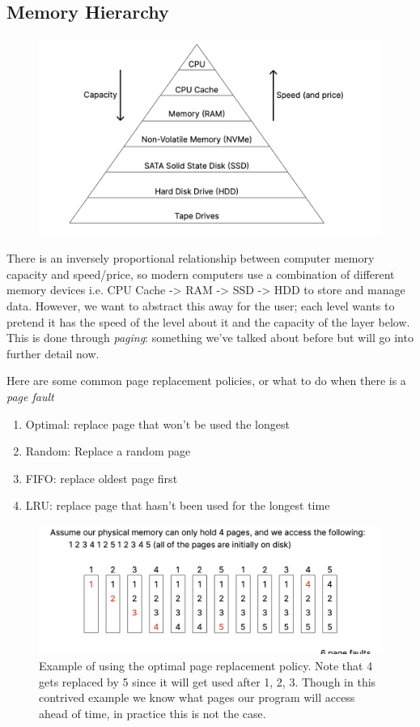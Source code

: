 \documentclass[../notes.tex]{subfiles}
\begin{document}
\subsection{Memory Hierarchy}
\begin{figure}[H]
    \centering
    \includegraphics[width=0.8\linewidth]{img/image_2023-03-29-13-48-02.png}
\end{figure}
There is an inversely proportional relationship between computer memory capacity and speed/price, so modern computers use a combination of different memory devices i.e. CPU Cache -> RAM -> SSD -> HDD to store and manage data.
However, we want to abstract this away for the user; each level wants to pretend it has the speed of the level about it and the capacity of the layer below. 
This is done through \textit{paging}: something we've talked about before but will go into further detail now.

Here are some common page replacement policies, or what to do when there is a \textit{page fault}
\begin{enumerate}
    \item Optimal: replace page that won't be used the longest
    \item Random: Replace a random page
    \item FIFO: replace oldest page first
    \item LRU: replace page that hasn't been used for the longest time
\end{enumerate}


\begin{figure}[H]
    \centering
    \includegraphics[width=0.8\linewidth]{img/image_2023-03-29-13-49-43.png}
    \caption{Example of using the optimal page replacement policy. Note that 4 gets replaced by 5 since it will get used after 1, 2, 3. Though in this contrived example we know what pages our program will access ahead of time, in practice this is not the case.}
\end{figure}
\end{document}
